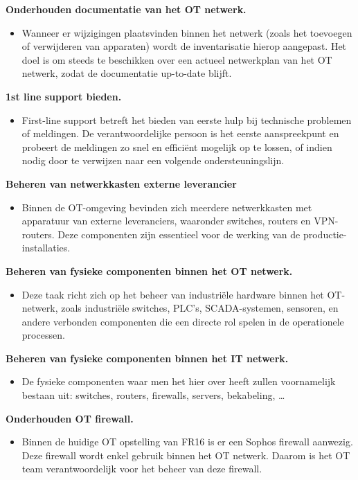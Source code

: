\textbf{Onderhouden documentatie van het OT netwerk.}
\begin{itemize}[label=\textbullet]
    \item Wanneer er wijzigingen plaatsvinden binnen het netwerk (zoals het toevoegen of verwijderen van apparaten) wordt de inventarisatie hierop aangepast. Het doel is om steeds te beschikken over een actueel netwerkplan van het OT netwerk, zodat de documentatie up-to-date blijft. 
\end{itemize}

\textbf{1st line support bieden.}
\begin{itemize}[label=\textbullet]
    \item  First-line support betreft het bieden van eerste hulp bij technische problemen of meldingen. De verantwoordelijke persoon is het eerste aanspreekpunt en probeert de meldingen zo snel en efficiënt mogelijk op te lossen, of indien nodig door te verwijzen naar een volgende ondersteuningslijn.
\end{itemize}

\textbf{Beheren van netwerkkasten externe leverancier}
\begin{itemize}[label=\textbullet]
    \item Binnen de OT-omgeving bevinden zich meerdere netwerkkasten met apparatuur van externe leveranciers, waaronder switches, routers en VPN-routers. Deze componenten zijn essentieel voor de werking van de productie-installaties. 
\end{itemize}

\textbf{Beheren van fysieke componenten binnen het OT netwerk.}
\begin{itemize}[label=\textbullet]
    \item Deze taak richt zich op het beheer van industriële hardware binnen het OT-netwerk, zoals industriële switches, PLC’s, SCADA-systemen, sensoren, en andere verbonden componenten die een directe rol spelen in de operationele processen.
\end{itemize}

\textbf{Beheren van fysieke componenten binnen het IT netwerk.}
\begin{itemize}[label=\textbullet]
    \item De fysieke componenten waar men het hier over heeft zullen voornamelijk bestaan uit: switches, routers, firewalls, servers, bekabeling, …
\end{itemize}

\textbf{Onderhouden OT firewall.}
\begin{itemize}[label=\textbullet]
    \item Binnen de huidige OT opstelling van FR16 is er een Sophos firewall aanwezig. Deze firewall wordt enkel gebruik binnen het OT netwerk. Daarom is het OT team verantwoordelijk voor het beheer van deze firewall.
\end{itemize}

